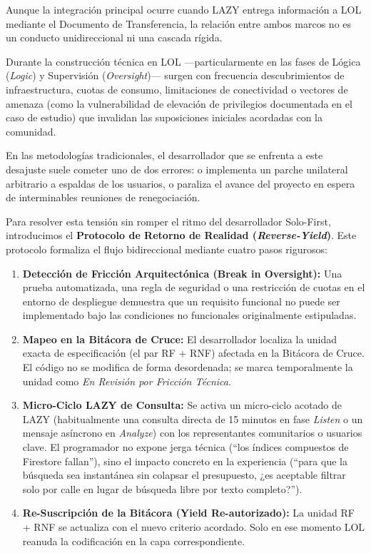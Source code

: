 \documentclass[14pt,a4paper,oneside]{extbook}
\begin{document}
Aunque la integración principal ocurre cuando LAZY entrega información a LOL mediante el Documento de Transferencia, la relación entre ambos marcos no es un conducto unidireccional ni una cascada rígida.

Durante la construcción técnica en LOL ---particularmente en las fases de Lógica (\textit{Logic}) y Supervisión (\textit{Oversight})--- surgen con frecuencia descubrimientos de infraestructura, cuotas de consumo, limitaciones de conectividad o vectores de amenaza (como la vulnerabilidad de elevación de privilegios documentada en el caso de estudio) que invalidan las suposiciones iniciales acordadas con la comunidad.

En las metodologías tradicionales, el desarrollador que se enfrenta a este desajuste suele cometer uno de dos errores: o implementa un parche unilateral arbitrario a espaldas de los usuarios, o paraliza el avance del proyecto en espera de interminables reuniones de renegociación.

Para resolver esta tensión sin romper el ritmo del desarrollador Solo-First, introducimos el \textbf{Protocolo de Retorno de Realidad (\textit{Reverse-Yield})}. Este protocolo formaliza el flujo bidireccional mediante cuatro pasos rigurosos:

\begin{enumerate}
    \item \textbf{Detección de Fricción Arquitectónica (Break in Oversight):} Una prueba automatizada, una regla de seguridad o una restricción de cuotas en el entorno de despliegue demuestra que un requisito funcional no puede ser implementado bajo las condiciones no funcionales originalmente estipuladas.
    \item \textbf{Mapeo en la Bitácora de Cruce:} El desarrollador localiza la unidad exacta de especificación (el par RF + RNF) afectada en la Bitácora de Cruce. El código no se modifica de forma desordenada; se marca temporalmente la unidad como \textit{En Revisión por Fricción Técnica}.
    \item \textbf{Micro-Ciclo LAZY de Consulta:} Se activa un micro-ciclo acotado de LAZY (habitualmente una consulta directa de 15 minutos en fase \textit{Listen} o un mensaje asíncrono en \textit{Analyze}) con los representantes comunitarios o usuarios clave. El programador no expone jerga técnica (\enquote{los índices compuestos de Firestore fallan}), sino el impacto concreto en la experiencia (\enquote{para que la búsqueda sea instantánea sin colapsar el presupuesto, ¿es aceptable filtrar solo por calle en lugar de búsqueda libre por texto completo?}).
    \item \textbf{Re-Suscripción de la Bitácora (Yield Re-autorizado):} La unidad RF + RNF se actualiza con el nuevo criterio acordado. Solo en ese momento LOL reanuda la codificación en la capa correspondiente.
\end{enumerate}
\end{document}
